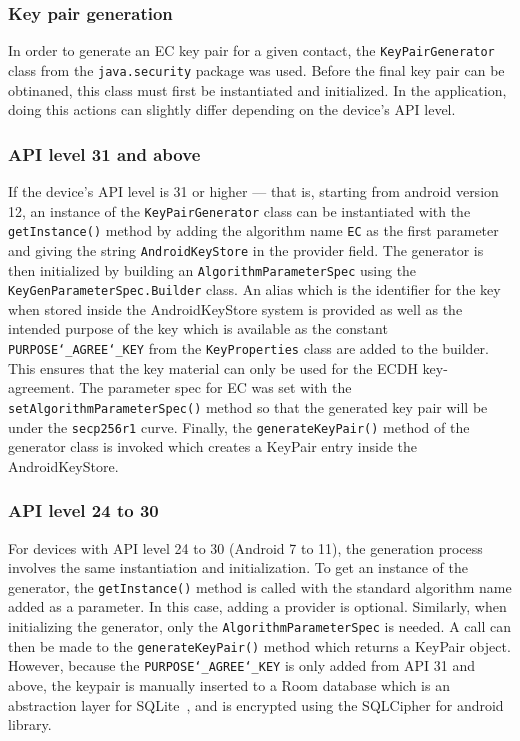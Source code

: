 \documentclass{report}
\begin{document}
\subsubsection{Key pair generation}
In order to generate an EC key pair for a given contact, the
\texttt{KeyPairGenerator} class from the \texttt{java.security}
package was used. Before the final key pair can be obtinaned, this class
must first be instantiated and initialized. In the application, doing this
actions can slightly differ depending on the device's API level.

\subsubsection*{API level 31 and above}
If the device's API level is 31 or higher --- that is, starting from android
version 12, an instance of the \texttt{KeyPairGene\newline rator} class can be
instantiated with the \texttt{getInstance()} method
by adding the algorithm name \texttt{EC} as the first parameter
and giving the string \texttt{AndroidKeyStore} in the provider field.
The generator is then initialized by building an \texttt{AlgorithmParameterSpec}
using the \texttt{KeyGenParameterSpec.Builder} class.
An alias which is the identifier for the key when stored inside the
AndroidKeyStore system is provided as well as the intended purpose of the key
which is available as the constant \texttt{PURPOSE\char`_AGREE\char`_KEY} from the
\texttt{KeyProperties} class are added to the builder. This ensures that the
key material can only be used for the ECDH key-agreement. The parameter
spec for EC was set with the \texttt{setAlgorithmParameterSpec()} method
so that the generated key pair will be under the \texttt{secp256r1} curve.
Finally, the \texttt{generateKeyPair()} method of the generator class is
invoked which creates a KeyPair entry inside the AndroidKeyStore.

\subsubsection*{API level 24 to 30}
For devices with API level 24 to 30 (Android 7 to 11), the generation process involves
the same instantiation and initialization. To get an instance of the
generator, the \texttt{getInstance()} method is called with the standard
algorithm name added as a parameter. In this case, adding a provider is
optional. Similarly, when initializing the generator, only the
\texttt{AlgorithmParameterSpec} is needed. A call can then be made to the
\texttt{generateKeyPair()} method which returns a KeyPair object. However,
because the \texttt{PURPOSE\char`_AGREE\char`_KEY} is only added from
API 31 and above, the keypair is manually inserted to a Room database which is
an abstraction layer for SQLite~\cite{room}, and is encrypted using the
SQLCipher for android~\cite{sqlcipher} library.
\end{document}
